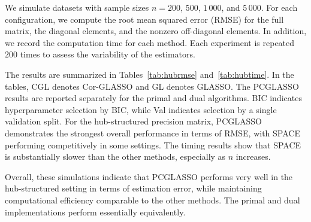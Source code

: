 \documentclass[12pt]{amsart}
\numberwithin{equation}{section}
\numberwithin{equation}{section}
\theoremstyle{plain}
\theoremstyle{definition}
\begin{document}
We simulate datasets with sample sizes $n = 200$, $500$, $1\,000$, and $5\,000$. For each configuration, we compute the root mean squared error (RMSE) for the full matrix, the diagonal elements, and the nonzero off-diagonal elements. In addition, we record the computation time for each method. Each experiment is repeated $200$ times to assess the variability of the estimators.

The results are summarized in Tables~\ref{tab:hubrmse} and~\ref{tab:hubtime}. In the tables, CGL denotes Cor-GLASSO and GL denotes GLASSO. The PCGLASSO results are reported separately for the primal and dual algorithms. BIC indicates hyperparameter selection by BIC, while Val indicates selection by a single validation split. For the hub-structured precision matrix, PCGLASSO demonstrates the strongest overall performance in terms of RMSE, with SPACE performing competitively in some settings. The timing results show that SPACE is substantially slower than the other methods, especially as $n$ increases.

Overall, these simulations indicate that PCGLASSO performs very well in the hub-structured setting in terms of estimation error, while maintaining computational efficiency comparable to the other methods. The primal and dual implementations perform essentially equivalently.
\end{document}
